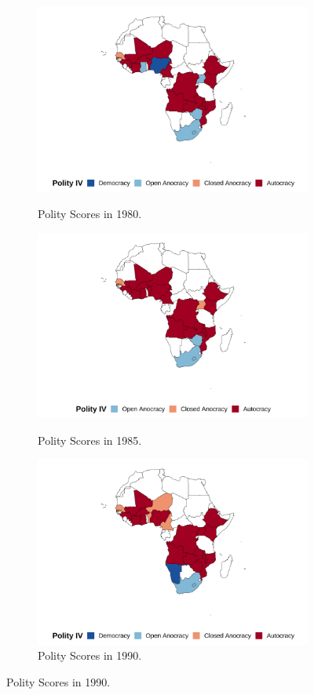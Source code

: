 \documentclass{wptemp}
\begin{document}
\begin{figure}[!htb]
\centering
\caption{Democracy in sample countries from 1980 to 2000.}
\label{fig1}
\begin{subfigure}{.48\textwidth}
\centering
\caption{Polity Scores in 1980.}
\includegraphics[width=.9\linewidth]{figure/1980.png}
\label{fig1980}
\end{subfigure}
\centering
\begin{subfigure}{.48\textwidth}
\centering
\caption{Polity Scores in 1985.}
\includegraphics[width=.9\linewidth]{figure/1985.png}
\label{fig1985}
\end{subfigure}
\begin{subfigure}{.48\textwidth}
\centering
\caption{Polity Scores in 1990.}
\includegraphics[width=.9\linewidth]{figure/1990.png}

\end{subfigure}
\end{figure}
\end{document}
